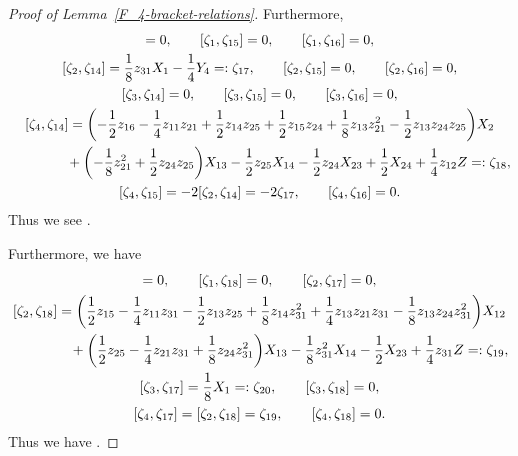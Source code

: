 \begin{proof}[Proof of Lemma~\ref{F_4-bracket-relations}]
Furthermore,
\begin{gather*}
[\zeta_1, \zeta_{14}] = 0, \qquad [\zeta_1, \zeta_{15}] = 0, \qquad [\zeta_1, \zeta_{16}] = 0, \\
[\zeta_2, \zeta_{14}] = \frac{1}{8}z_{31}X_1 - \frac{1}{4}Y_4 =: \zeta_{17}, \qquad
[\zeta_2, \zeta_{15}] = 0, \qquad [\zeta_2, \zeta_{16}] = 0, \\
[\zeta_3, \zeta_{14}] = 0, \qquad [\zeta_3, \zeta_{15}] = 0, \qquad [\zeta_3, \zeta_{16}] = 0,\\
[\zeta_4, \zeta_{14}] = \biggl(-\frac{1}{2}z_{16} - \frac{1}{4}z_{11}z_{21} + \frac{1}{2}z_{14}z_{25}
+ \frac{1}{2}z_{15}z_{24} + \frac{1}{8}z_{13}z_{21}^2 - \frac{1}{2}z_{13}z_{24}z_{25}\biggr)X_2\\
\hphantom{[\zeta_4, \zeta_{14}] =}{}
+\biggl(-\frac{1}{8}z_{21}^2 + \frac{1}{2}z_{24}z_{25}\biggr)X_{13} - \frac{1}{2}z_{25}X_{14} - \frac{1}{2}z_{24}X_{23} + \frac{1}{2}X_{24} + \frac{1}{4}z_{12}Z =: \zeta_{18},\\
[\zeta_4, \zeta_{15}] = -2[\zeta_2, \zeta_{14}] = -2\zeta_{17}, \qquad
[\zeta_4, \zeta_{16}] = 0.
\end{gather*}
Thus we see .

Furthermore, we have
\begin{gather*}
[\zeta_1, \zeta_{17}] = 0, \qquad [\zeta_1, \zeta_{18}] = 0, \qquad [\zeta_2, \zeta_{17}] = 0, \\
[\zeta_2, \zeta_{18}] = \biggl(\frac{1}{2}z_{15} - \frac{1}{4}z_{11}z_{31} - \frac{1}{2}z_{13}z_{25} + \frac{1}{8}z_{14}z_{31}^2
+ \frac{1}{4}z_{13}z_{21}z_{31} - \frac{1}{8}z_{13}z_{24}z_{31}^2\biggr)X_{12}
\\
\hphantom{[\zeta_2, \zeta_{18}] =}{}
+ \biggl(\frac{1}{2}z_{25} - \frac{1}{4}z_{21}z_{31} + \frac{1}{8}z_{24}z_{31}^2\biggr)X_{13} - \frac{1}{8}z_{31}^2X_{14} - \frac{1}{2}X_{23} + \frac{1}{4}z_{31}Z =: \zeta_{19},
\\
[\zeta_3, \zeta_{17}] = \frac{1}{8}X_1 =: \zeta_{20}, \qquad [\zeta_3, \zeta_{18}] = 0, \\
[\zeta_4, \zeta_{17}] = [\zeta_2, \zeta_{18}] = \zeta_{19}, \qquad [\zeta_4, \zeta_{18}] = 0.
\end{gather*}
Thus we have
.


\end{proof}
